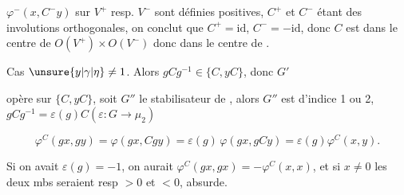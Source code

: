 
$\varphi^-(x,C^-y)$ sur $V^+$ resp. $V^-$ sont définies positives, $C^+$ et $C^-$ étant des  involutions orthogonales, on conclut que $C^+=\mathrm{id}$, $C^-=-\mathrm{id}$, donc $C$ est dans le centre de  $O(V^+)\times O(V^-)$ donc dans le centre de .

Cas $\unsure{y|\gamma|\eta}\ne1$. Alors $gCg^{-1}\in\{C,yC\}$, donc $G'$   


opère sur $\{C,yC\}$,  soit $G''$ le stabilisateur de , alors $G''$ est d'indice 1 ou 2,    $gCg^{-1}=\varepsilon(g)C$\quad $(\varepsilon:G\longrightarrow\mu_2)$

\[
\varphi^C(gx,gy)=\varphi(gx,Cgy)=\varepsilon(g)\,\varphi(gx,gCy)=\varepsilon(g)\varphi^C(x,y).
\]


Si on avait $\varepsilon(g)=-1$, on aurait $\varphi^C(gx,gx)=-\varphi^C(x,x)$, et si $x\ne0$ les deux mbs seraient resp $>0$ et $<0$, absurde.

